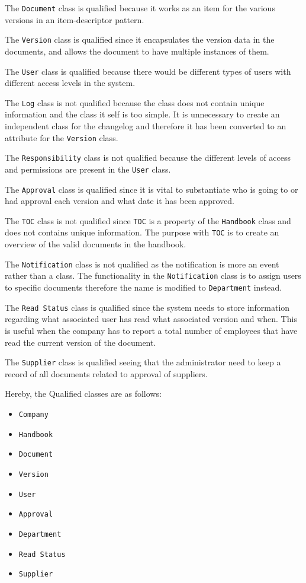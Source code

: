 The \texttt{Document} class is qualified because it works as an item for the various versions in an item-descriptor pattern.

The \texttt{Version} class is qualified since it encapsulates the version data in the documents, and allows the document to have multiple instances of them.

The \texttt{User} class is qualified because there would be different types of users with different access levels in the system.

The \texttt{Log} class is not qualified because the class does not contain unique information and the class it self is too simple.
It is unnecessary to create an independent class for the changelog and therefore it has been converted to an attribute for the \texttt{Version} class.

The \texttt{Responsibility} class is not qualified because the different levels of access and permissions are present in the \texttt{User} class.

The \texttt{Approval} class is qualified since it is vital to substantiate who is going to or had approval each version and what date it has been approved.

The \texttt{TOC} class is not qualified since \texttt{TOC} is a property of the \texttt{Handbook} class and does not contains unique information.
The purpose with \texttt{TOC} is to create an overview of the valid documents in the handbook.

The \texttt{Notification} class is not qualified as the notification is more an event rather than a class.
The functionality in the \texttt{Notification} class is to assign users to specific documents therefore the name is modified to \texttt{Department} instead.

The \texttt{Read Status} class is qualified since the system needs to store information regarding what associated user has read what associated version and when.
This is useful when the company has to report a total number of employees that have read the current version of the document.

The \texttt{Supplier} class is qualified seeing that the administrator need to keep a record of all documents related to approval of suppliers. 

Hereby, the Qualified classes are as follows:
\begin{itemize} 
	\item \texttt{Company}
	\item \texttt{Handbook}
	\item \texttt{Document}
	\item \texttt{Version}
	\item \texttt{User}
	\item \texttt{Approval}
	\item \texttt{Department}
	\item \texttt{Read Status}
	\item \texttt{Supplier}
\end{itemize}

